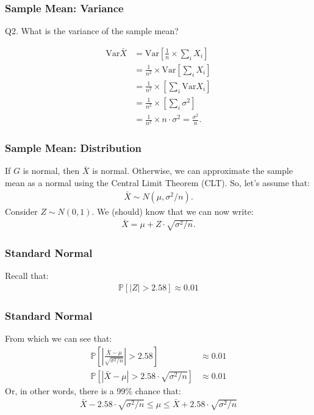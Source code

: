 \documentclass{beamer}
\newcommand{\Prob}{\mathbb{P}}
\newcommand{\V}{\text{Var}}
\begin{document}
\begin{frame}
\frametitle{Sample Mean: Variance}

Q2. What is the variance of the sample mean? \pause

\begin{align*}
\V \bar{X} &= \V \left[ \frac{1}{n} \times \sum_i X_i \right] \\
&= \frac{1}{n^2} \times \V \left[ \sum_i X_i \right] \\
&= \frac{1}{n^2} \times \left[ \sum_i \V X_i \right] \\
&= \frac{1}{n^2} \times \left[ \sum_i \sigma^2 \right] \\
&= \frac{1}{n^2} \times n \cdot \sigma^2 = \frac{\sigma^2}{n}.
\end{align*}

\end{frame}

\begin{frame}
\frametitle{Sample Mean: Distribution}

If $G$ is normal, then $\bar{X}$ is normal. Otherwise, we can
approximate the sample mean as a normal using the Central Limit Theorem (CLT).
So, let's assume that:
\begin{align*}
\bar{X} \sim N(\mu, \sigma^2 / n).
\end{align*}
\pause Consider $Z \sim N(0, 1)$. We (should) know that we can now write:
\begin{align*}
\bar{X} = \mu + Z \cdot \sqrt{\sigma^2 / n}.
\end{align*}

\end{frame}

\begin{frame}
\frametitle{Standard Normal}

Recall that:
\begin{align*}
\Prob \left[ |Z| > 2.58 \right] \approx 0.01
\end{align*}

\end{frame}

\begin{frame}
\frametitle{Standard Normal}

From which we can see that:
\begin{align*}
\Prob \left[ \left|\frac{\bar{X} - \mu}{\sqrt{\sigma^2 / n}} \right| > 2.58 \right] &\approx 0.01 \\
\Prob \left[ |\bar{X} - \mu| > 2.58 \cdot \sqrt{\sigma^2 / n} \right] &\approx 0.01
\end{align*}
Or, in other words, there is a 99\% chance that:
\begin{align*}
\bar{X} - 2.58 \cdot \sqrt{\sigma^2 / n} \leq \mu \leq \bar{X} + 2.58 \cdot \sqrt{\sigma^2 / n}
\end{align*}

\end{frame}
\end{document}
